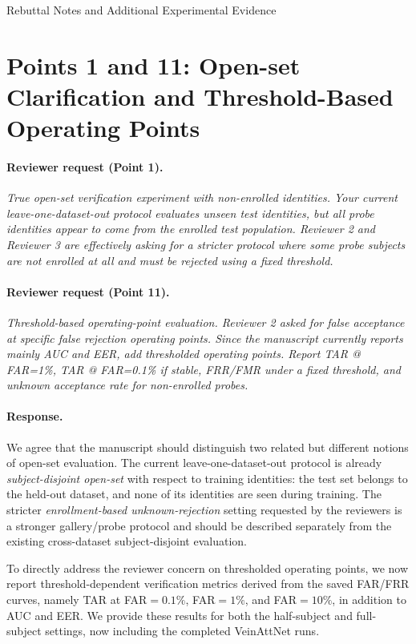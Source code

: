 \documentclass[11pt]{article}
\begin{document}
\begin{center}
    {\LARGE Rebuttal Notes and Additional Experimental Evidence}
\end{center}

\section*{Points 1 and 11: Open-set Clarification and Threshold-Based Operating Points}

\paragraph{Reviewer request (Point 1).}
\emph{True open-set verification experiment with non-enrolled identities. Your current leave-one-dataset-out protocol evaluates unseen test identities, but all probe identities appear to come from the enrolled test population. Reviewer 2 and Reviewer 3 are effectively asking for a stricter protocol where some probe subjects are not enrolled at all and must be rejected using a fixed threshold.}

\paragraph{Reviewer request (Point 11).}
\emph{Threshold-based operating-point evaluation. Reviewer 2 asked for false acceptance at specific false rejection operating points. Since the manuscript currently reports mainly AUC and EER, add thresholded operating points. Report TAR @ FAR=1\%, TAR @ FAR=0.1\% if stable, FRR/FMR under a fixed threshold, and unknown acceptance rate for non-enrolled probes.}

\paragraph{Response.}
We agree that the manuscript should distinguish two related but different notions of open-set evaluation. The current leave-one-dataset-out protocol is already \emph{subject-disjoint open-set} with respect to training identities: the test set belongs to the held-out dataset, and none of its identities are seen during training. The stricter \emph{enrollment-based unknown-rejection} setting requested by the reviewers is a stronger gallery/probe protocol and should be described separately from the existing cross-dataset subject-disjoint evaluation.

To directly address the reviewer concern on thresholded operating points, we now report threshold-dependent verification metrics derived from the saved FAR/FRR curves, namely TAR at FAR$=0.1\%$, FAR$=1\%$, and FAR$=10\%$, in addition to AUC and EER. We provide these results for both the half-subject and full-subject settings, now including the completed VeinAttNet runs.
\end{document}
